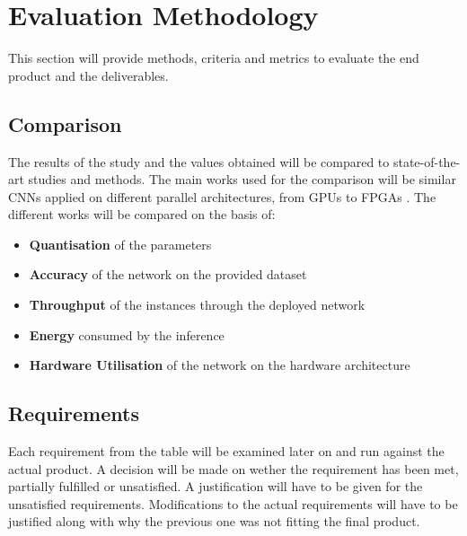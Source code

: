 \section{Evaluation Methodology}

This section will provide methods, criteria and metrics to evaluate the end product and the deliverables.


\subsection{Comparison}

The results of the study and the values obtained will be compared to state-of-the-art studies and methods. The main works used for the comparison will be similar CNNs applied on different parallel architectures, from GPUs \cite{Micikevicius2017, Jia2018, Kurth2018} to FPGAs \cite{Zhao2016, Colangelo2018, Jahanshahi2019, Bacchus2020}. The different works will be compared on the basis of:
\begin{itemize}
  \item \textbf{Quantisation} of the parameters
  \item \textbf{Accuracy} of the network on the provided dataset
  \item \textbf{Throughput} of the instances through the deployed network
  \item \textbf{Energy} consumed by the inference
  \item \textbf{Hardware Utilisation} of the network on the hardware architecture
\end{itemize}


\subsection{Requirements}

Each requirement from the table will be examined later on and run against the actual product. A decision will be made on wether the requirement has been met, partially fulfilled or unsatisfied. A justification will have to be given for the unsatisfied requirements. Modifications to the actual requirements will have to be justified along with why the previous one was not fitting the final product.

